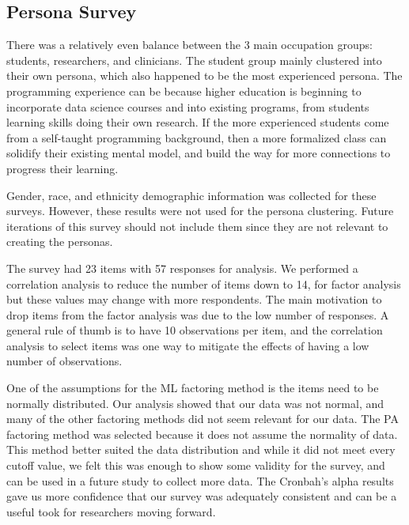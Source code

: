 \documentclass[020-persona_validation.tex]{subfiles}
\begin{document}

    \subsection{Persona Survey}

        There was a relatively even balance between the 3 main occupation groups: students, researchers, and clinicians.
        The student group mainly clustered into their own persona,
        which also happened to be the most experienced persona.
        The programming experience can be because higher education is beginning to incorporate data science courses and
        into existing programs,
        from students learning skills doing their own research.
        If the more experienced students come from a self-taught programming background,
        then a more formalized class can solidify their existing mental model,
        and build the way for more connections to progress their learning.

        Gender, race, and ethnicity demographic information was collected for these surveys.
        However, these results were not used for the persona clustering.
        Future iterations of this survey should not include them since they are not relevant to creating the personas.

        The survey had 23 items with 57 responses for analysis.
        We performed a correlation analysis to reduce the number of items down to 14, for factor analysis
        but these values may change with more respondents.
        The main motivation to drop items from the factor analysis was due to the low number of responses.
        A general rule of thumb is to have 10 observations per item,
        and the correlation analysis to select items was one way to mitigate the effects of having a low number of observations.

        One of the assumptions for the ML factoring method is the items need to be normally distributed.
        Our analysis showed that our data was not normal,
        and many of the other factoring methods did not seem relevant for our data.
        The PA factoring method was selected because it does not assume the normality of data.
        This method better suited the data distribution and
        while it did not meet every cutoff value,
        we felt this was enough to show some validity for the survey,
        and can be used in a future study to collect more data.
        The Cronbah's alpha results gave us more confidence that our survey was adequately consistent and
        can be a useful took for researchers moving forward.
\end{document}
